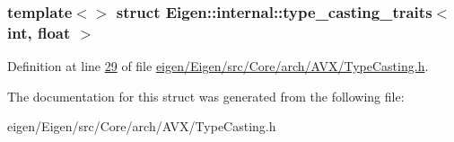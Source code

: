 \subsubsection*{template$<$$>$\newline
struct Eigen\+::internal\+::type\+\_\+casting\+\_\+traits$<$ int, float $>$}



Definition at line \hyperlink{eigen_2_eigen_2src_2_core_2arch_2_a_v_x_2_type_casting_8h_source_l00029}{29} of file \hyperlink{eigen_2_eigen_2src_2_core_2arch_2_a_v_x_2_type_casting_8h_source}{eigen/\+Eigen/src/\+Core/arch/\+A\+V\+X/\+Type\+Casting.\+h}.



The documentation for this struct was generated from the following file\+:\begin{DoxyCompactItemize}
\item 
eigen/\+Eigen/src/\+Core/arch/\+A\+V\+X/\+Type\+Casting.\+h\end{DoxyCompactItemize}
